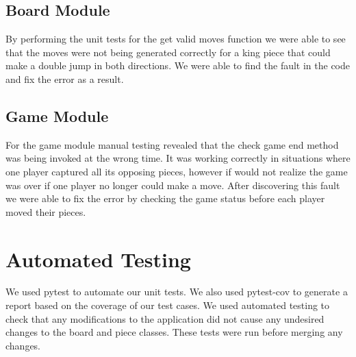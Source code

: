 \documentclass[12pt, titlepage]{article}
\begin{document}
\subsection{Board Module}
    By performing the unit tests for the get valid moves function we were able to see that the moves were not being generated correctly for a king piece that could make a double jump in both directions. We were able to find the fault in the code and fix the error as a result.
\subsection{Game Module}
    For the game module manual testing revealed that the check game end method was being invoked at the wrong time. It was working correctly in situations where one player captured all its opposing pieces, however if would not realize the game was over if one player no longer could make a move. After discovering this fault we were able to fix the error by checking the game status before each player moved their pieces.
\section{Automated Testing}
We used pytest to automate our unit tests. We also used pytest-cov to generate a report based on the coverage of our test cases. We used automated testing to check that any modifications to the application did not cause any undesired changes to the board and piece classes. These tests were run before merging any changes.
\end{document}
